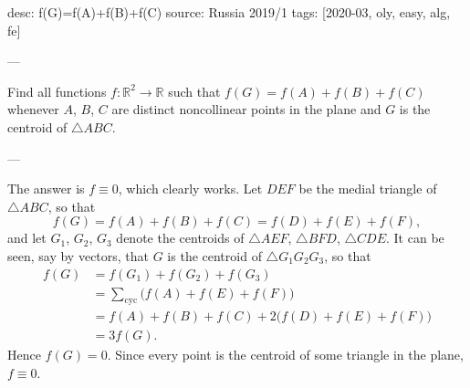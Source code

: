 desc: f(G)=f(A)+f(B)+f(C)
source: Russia 2019/1
tags: [2020-03, oly, easy, alg, fe]

---

Find all functions $f:\mathbb R^2\to\mathbb R$ such that $f(G)=f(A)+f(B)+f(C)$ whenever $A$, $B$, $C$ are distinct noncollinear points in the plane and $G$ is the centroid of $\triangle ABC$.

---

The answer is $f\equiv0$, which clearly works. Let $DEF$ be the medial triangle of $\triangle ABC$, so that \[f(G)=f(A)+f(B)+f(C)=f(D)+f(E)+f(F),\]
and let $G_1$, $G_2$, $G_3$ denote the centroids of $\triangle AEF$, $\triangle BFD$, $\triangle CDE$. It can be seen, say by vectors, that $G$ is the centroid of $\triangle G_1G_2G_3$, so that
\begin{align*}
    f(G)&=f(G_1)+f(G_2)+f(G_3)\\
    &=\sum_\mathrm{cyc}\big(f(A)+f(E)+f(F)\big)\\
    &=f(A)+f(B)+f(C)+2\big(f(D)+f(E)+f(F)\big)\\
    &=3f(G).
\end{align*}
Hence $f(G)=0$. Since every point is the centroid of some triangle in the plane, $f\equiv0$.
